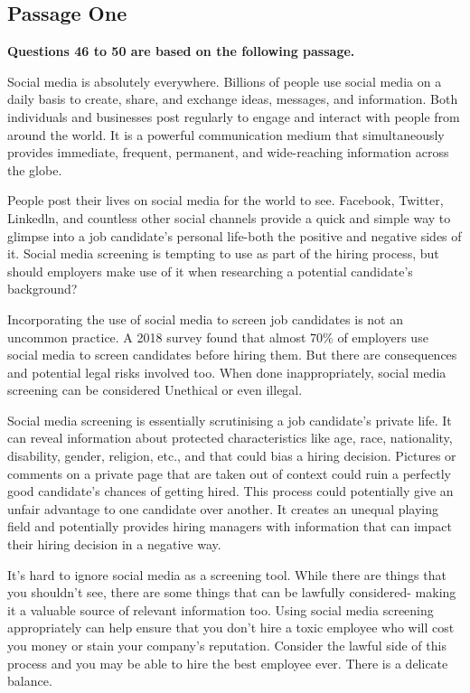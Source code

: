 \documentclass[UTF8,11pt]{ctexart}
\begin{document}
\subsection*{\textbf{Passage One}}


\textbf{Questions 46 to 50 are based on the following passage.}


Social media is absolutely everywhere. Billions of people use social media on a daily basis to create, share, and exchange ideas, messages, and information. Both individuals and businesses post regularly to engage and interact with people from around the world. It is a powerful communication medium that simultaneously provides immediate, frequent, permanent, and wide-reaching information across the globe.


People post their lives on social media for the world to see. Facebook, Twitter, Linkedln, and countless other social channels provide a quick and simple way to glimpse into a job candidate's personal life-both the positive and negative sides of it. Social media screening is tempting to use as part of the hiring process, but should employers make use of it when researching a potential candidate's background?


Incorporating the use of social media to screen job candidates is not an uncommon practice. A 2018 survey found that almost 70\% of employers use social media to screen candidates before hiring them. But there are consequences and potential legal risks involved too. When done inappropriately, social media screening can be considered Unethical or even illegal.


Social media screening is essentially scrutinising a job candidate's private life. It can reveal information about protected characteristics like age, race, nationality, disability, gender, religion, etc., and that could bias a hiring decision. Pictures or comments on a private page that are taken out of context could ruin a perfectly good candidate's chances of getting hired. This process could potentially give an unfair advantage to one candidate over another. It creates an unequal playing field and potentially provides hiring managers with information that can impact their hiring decision in a negative way.


It's hard to ignore social media as a screening tool. While there are things that you shouldn't see, there are some things that can be lawfully considered- making it a valuable source of relevant information too. Using social media screening appropriately can help ensure that you don't hire a toxic employee who will cost you money or stain your company's reputation. Consider the lawful side of this process and you may be able to hire the best employee ever. There is a delicate balance.
\end{document}
